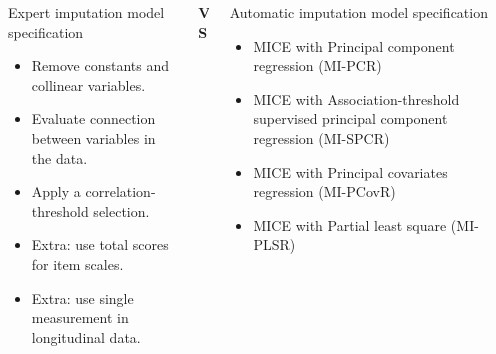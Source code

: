 \documentclass{beamer}\usepackage[]{graphicx}\usepackage[]{xcolor}
\begin{document}
\begin{frame}[fragile]
\begin{columns}[c]
\begin{column}{.46\textwidth}
  \end{column}

  \end{columns}

  \bigskip
  \bigskip


\begin{columns}[T]
\begin{column}{.42\textwidth}

\begin{block}{Expert imputation model specification}

  \begin{itemize}
      \item Remove constants and collinear variables.
      \item Evaluate connection between variables in the data.
      \item Apply a correlation-threshold selection.
      \item Extra: use total scores for item scales.
      \item Extra: use single measurement in longitudinal data.
  \end{itemize}

\end{block}

\end{column}

\begin{column}{.06\textwidth}
  \vspace{5cm}
  \begin{center}
    \huge \textbf{VS}
    \end{center}

  \end{column}

\begin{column}{.42\textwidth}

\begin{block}{Automatic imputation model specification}

  \begin{itemize}
    \item MICE with Principal component regression (MI-PCR)
    \item MICE with Association-threshold supervised principal component regression (MI-SPCR)
    \item MICE with Principal covariates regression (MI-PCovR)
    \item MICE with Partial least square (MI-PLSR)
  \end{itemize}


\end{block}
\end{column}
\end{columns}
\end{frame}
\end{document}
